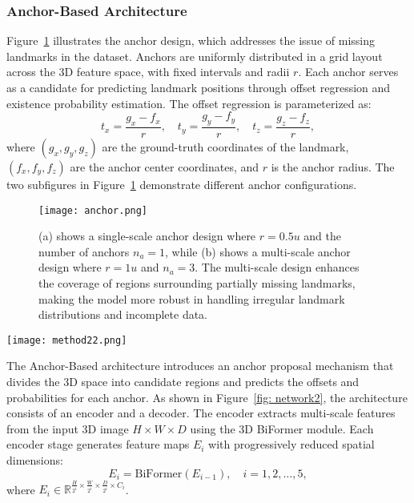 \subsubsection{Anchor-Based Architecture}
Figure~\ref{fig:anchor} illustrates the anchor design, which addresses the issue of missing landmarks in the dataset. Anchors are uniformly distributed in a grid layout across the 3D feature space, with fixed intervals and radii \( r \). Each anchor serves as a candidate for predicting landmark positions through offset regression and existence probability estimation. The offset regression is parameterized as:
\begin{equation}
t_x = \frac{g_x - f_x}{r}, \quad t_y = \frac{g_y - f_y}{r}, \quad t_z = \frac{g_z - f_z}{r},
\end{equation}
where \( (g_x, g_y, g_z) \) are the ground-truth coordinates of the landmark, \( (f_x, f_y, f_z) \) are the anchor center coordinates, and \( r \) is the anchor radius. The two subfigures in Figure~\ref{fig:anchor} demonstrate different anchor configurations. 
\begin{figure}[htbp]
\centering
\texttt{[image: anchor.png]}
\caption{(a) shows a single-scale anchor design where \( r = 0.5u \) and the number of anchors \( n_a = 1 \), while (b) shows a multi-scale anchor design where \( r = 1u \) and \( n_a = 3 \). The multi-scale design enhances the coverage of regions surrounding partially missing landmarks, making the model more robust in handling irregular landmark distributions and incomplete data.}
\label{fig:anchor}
\end{figure}


\begin{figure*}[htbp]
\centering
\begin{minipage}{\textwidth}
  \centering
  \texttt{[image: method22.png]}
  \caption{The overview of proposed Hybrid-3D Network(H3DE-Net): Anchor-Based Architectures.}
  \label{fig: network2}
\end{minipage}
\end{figure*}


The Anchor-Based architecture introduces an anchor proposal mechanism that divides the 3D space into candidate regions and predicts the offsets and probabilities for each anchor. As shown in Figure~\ref{fig: network2}, the architecture consists of an encoder and a decoder. The encoder extracts multi-scale features from the input 3D image \( H \times W \times D \) using the 3D BiFormer module. Each encoder stage generates feature maps \( E_i \) with progressively reduced spatial dimensions:
\begin{equation}
E_i = \text{BiFormer}(E_{i-1}), \quad i = 1, 2, \ldots, 5,
\end{equation}
where \( E_i \in \mathbb{R}^{\frac{H}{2^i} \times \frac{W}{2^i} \times \frac{D}{2^i} \times C_i} \). 

